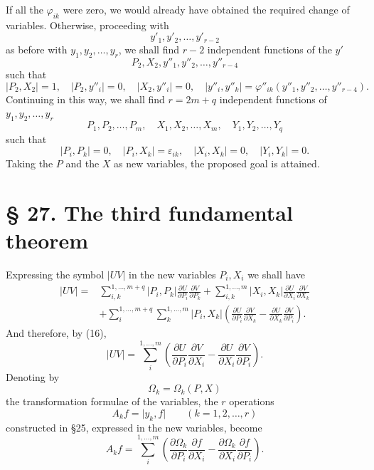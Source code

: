 \documentclass[11pt]{book}
\begin{document}
If all the $\varphi_{ik}$ were zero, we would already have obtained the required change of variables. Otherwise, proceeding with
\[
 y'_1,y'_2,\ldots,y'_{r-2}
\]
as before with $y_1,y_2,\ldots,y_r$, we shall find $r-2$ independent functions of the $y'$
\[
 P_2,
 X_2,
 y''_1,y''_2,\ldots,y''_{r-4}
\]
such that
\[
 \lvert P_2,X_2\rvert=1,
 \quad \lvert P_2,y''_i\rvert=0,
 \quad \lvert X_2,y''_i\rvert=0,
 \quad
 \lvert y''_i,y''_k\rvert=\varphi''_{ik}(y''_1,y''_2,\ldots,y''_{r-4}).
\]
Continuing in this way, we shall find $r=2m+q$ independent functions of $y_1,y_2,\ldots,y_r$
\[
 P_1,P_2,\ldots,P_m,
 \quad X_1,X_2,\ldots,X_m,
 \quad Y_1,Y_2,\ldots,Y_q
\]
such that
\begin{equation*}\tag{16}
 \lvert P_i,P_k\rvert=0,
 \quad \lvert P_i,X_k\rvert=\varepsilon_{ik},
 \quad \lvert X_i,X_k\rvert=0,
 \quad \lvert Y_i,Y_k\rvert=0.
\end{equation*}
Taking the $P$ and the $X$ as new variables, the proposed goal is attained.

\section*{\S{} 27. The third fundamental theorem}

Expressing the symbol $\lvert UV\rvert$ in the new variables $P_i,X_i$ we shall have
\[
\begin{split}
\lvert UV\rvert={}&
 \sum\limits_{i,k}^{1,\ldots,m+q}\lvert P_i,P_k\rvert
        \frac{\partial U}{\partial P_i}\frac{\partial V}{\partial P_k}
 +\sum\limits_{i,k}^{1,\ldots,m}\lvert X_i,X_k\rvert
        \frac{\partial U}{\partial X_i}\frac{\partial V}{\partial X_k}        \\
&+\sum\limits_i^{1,\ldots,m+q}\sum\limits_k^{1,\ldots,m}
 \lvert P_i,X_k\rvert
 \left(
  \frac{\partial U}{\partial P_i}\frac{\partial V}{\partial X_k}
 -\frac{\partial U}{\partial X_k}\frac{\partial V}{\partial P_i}
 \right).
\end{split}
\]
And therefore, by (16),
\[
 \lvert UV\rvert=
 \sum\limits_i^{1,\ldots,m}
 \left(
  \frac{\partial U}{\partial P_i}\frac{\partial V}{\partial X_i}
 -\frac{\partial U}{\partial X_i}\frac{\partial V}{\partial P_i}
 \right).
\]
Denoting by
\[
 \Omega_k=\Omega_k(P,X)
\]
the transformation formulae of the variables, the $r$ operations
\[
 A_k f=\lvert y_k,f\rvert\qquad (k=1,2,\ldots,r)
\]
constructed in \S{}25, expressed in the new variables, become
\begin{equation*}\tag{17}
 A_kf=\sum\limits_i^{1,\ldots,m}
 \left(
  \frac{\partial\Omega_k}{\partial P_i}\frac{\partial f}{\partial X_i}
 -\frac{\partial\Omega_k}{\partial X_i}\frac{\partial f}{\partial P_i}
 \right).
\end{equation*}
\end{document}
